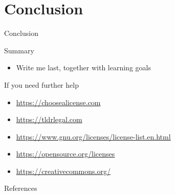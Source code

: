 \documentclass[compress,aspectratio=169]{beamer}
\begin{document}
  \section{Conclusion}

  \begin{frame}{Conclusion}
		\label{pg:lastpage} %
    \begin{block}{Summary}
      \begin{itemize}
        \item Write me last, together with learning goals
      \end{itemize}
    \end{block}
    \pause
    \begin{block}{If you need further help}
      \begin{itemize}
        \item \href{https://choosealicense.com/}{\url{https://choosealicense.com}}
        \item \href{https://tldrlegal.com/}{\url{https://tldrlegal.com}}
        \item \href{https://www.gnu.org/licenses/license-list.en.html}{\url{https://www.gnu.org/licenses/license-list.en.html}}
        \item \href{https://opensource.org/licenses}{\url{https://opensource.org/licenses}}
        \item \href{https://creativecommons.org/}{\url{https://creativecommons.org/}}
      \end{itemize}
    \end{block}
  \end{frame}

	\begin{frame}{References}
		\renewcommand*{\bibfont}{\normalfont\scriptsize}
		\printbibliography[heading=none]
	\end{frame}
\end{document}
